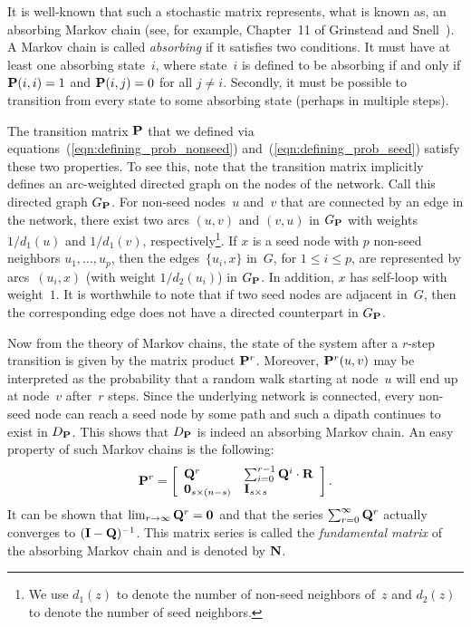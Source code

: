 It is well-known that such a stochastic matrix represents, what is known as, an 
absorbing Markov chain (see, for example, Chapter~11 of Grinstead and Snell~\cite{GS98}).  
A Markov chain is called \emph{absorbing} if it satisfies two conditions. 
It must have at least one absorbing state~$i$, where state~$i$ is defined 
to be absorbing if and only if $\mathbf{P}(i,i) = 1$ and $\mathbf{P}(i, j) = 0$ 
for all $j \neq i$. Secondly, it must be possible to transition from every state to 
    some absorbing state (perhaps in multiple steps). 

The transition matrix $\mathbf{P}$ that we defined via equations~(\ref{eqn:defining_prob_nonseed}) 
and~(\ref{eqn:defining_prob_seed}) satisfy these two properties. To see this, note that 
the transition matrix implicitly defines an arc-weighted  directed graph on the nodes 
of the network. Call this directed graph $G_{\mathbf{P}}$. For non-seed nodes~$u$ and~$v$ that 
are connected by an edge in the network, there exist two arcs $(u, v)$ and $(v, u)$ 
in $G_{\mathbf{P}}$ with weights $1/d_1(u)$ and $1/d_1(v)$, respectively\footnote{We use 
$d_1(z)$ to denote the number of non-seed neighbors of~$z$ and $d_2(z)$ to denote 
the number of seed neighbors.}. If $x$ is a seed node with $p$ non-seed neighbors 
$u_1, \ldots, u_p$, then the edges~$\{u_i, x\}$ in~$G$, for $1 \leq i \leq p$, 
are represented by arcs~$(u_i, x)$ (with weight $1 /d_2(u_i)$) in $G_{\mathbf{P}}$. 
In addition, $x$ has self-loop with weight~$1$. It is worthwhile to note 
that if two seed nodes are adjacent in~$G$, then the corresponding edge does not have a 
directed counterpart in $G_{\mathbf{P}}$.  

Now from the theory of Markov chains, the state of the system after a $r$-step transition 
is given by the matrix product $\mathbf{P}^r$. Moreover, $\mathbf{P}^r (u, v)$ may be interpreted 
as the probability that a random walk starting at node~$u$ will end up at node~$v$ 
after~$r$ steps. Since the underlying network is connected, every non-seed node can reach a seed
node by some path and such a dipath continues to exist in $D_{\mathbf{P}}$. This shows that $D_{\mathbf{P}}$
is indeed an absorbing Markov chain. An easy property of such Markov chains is the following:
\begin{equation}\label{exp:rth_product_of_P}
	\mathbf{P}^r = \left [ \begin{array}{ll}
						\mathbf{Q}^r  					& \sum_{i = 0}^{r - 1}\mathbf{Q}^i \cdot \mathbf{R} \\
						 \mathbf{0}_{s \times (n - s)} & \mathbf{I}_{s \times s}
						\end{array}
				\right ].
\end{equation}  
It can be shown that $\lim_{r \to \infty} \mathbf{Q}^{r} = \mathbf{0}$ and that 
the series $\sum_{r = 0}^{\infty} \mathbf{Q}^{r}$ actually converges to 
$(\mathbf{I} - \mathbf{Q})^{-1}$. This matrix series is called the \emph{fundamental matrix}
of the absorbing Markov chain and is denoted by $\mathbf{N}$. 

